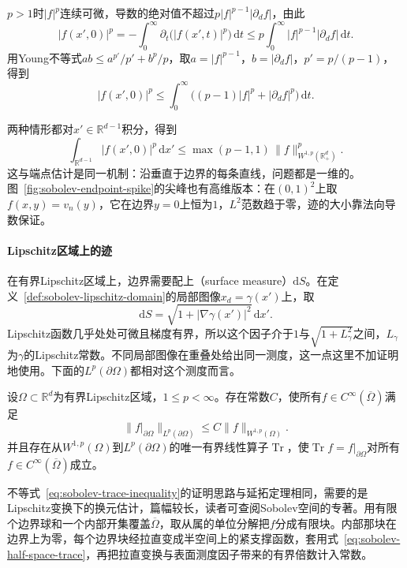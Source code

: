 $p>1$时$|f|^p$连续可微，导数的绝对值不超过$p|f|^{p-1}|\partial_df|$，由此
\[
|f(x',0)|^p=-\int_0^\infty\partial_t\bigl(|f(x',t)|^p\bigr)\,\mathrm dt
\leq p\int_0^\infty|f|^{p-1}|\partial_df|\,\mathrm dt .
\]
用Young不等式$ab\leq a^{p'}/p'+b^p/p$，取$a=|f|^{p-1}$，$b=|\partial_df|$，$p'=p/(p-1)$，得到
\[
|f(x',0)|^p\leq\int_0^\infty\bigl((p-1)|f|^p+|\partial_df|^p\bigr)\,\mathrm dt .
\]

两种情形都对$x'\in\mathbb R^{d-1}$积分，得到
\begin{equation}
\int_{\mathbb R^{d-1}}|f(x',0)|^p\,\mathrm dx'\leq\max(p-1,1)\,\lVert f\rVert_{W^{1,p}(\mathbb R^d_+)}^p .
\label{eq:sobolev-half-space-trace}
\end{equation}
这与端点估计是同一机制：沿垂直于边界的每条直线，问题都是一维的。图~\ref{fig:sobolev-endpoint-spike}的尖峰也有高维版本：在$(0,1)^2$上取$f(x,y)=v_n(y)$，它在边界$y=0$上恒为$1$，$L^2$范数趋于零，迹的大小靠法向导数保证。

\paragraph{Lipschitz区域上的迹}
在有界Lipschitz区域上，边界需要配上（surface measure）$\mathrm dS$。在定义~\ref{def:sobolev-lipschitz-domain}的局部图像$x_d=\gamma(x')$上，取
\[
\mathrm dS=\sqrt{1+|\nabla\gamma(x')|^2}\,\mathrm dx' .
\]
Lipschitz函数几乎处处可微且梯度有界，所以这个因子介于$1$与$\sqrt{1+L_\gamma^2}$之间，$L_\gamma$为$\gamma$的Lipschitz常数。不同局部图像在重叠处给出同一测度，这一点这里不加证明地使用。下面的$L^p(\partial\Omega)$都相对这个测度而言。

\begin{theorem}[迹定理]
\label{thm:sobolev-trace}
设$\Omega\subset\mathbb R^d$为有界Lipschitz区域，$1\leq p<\infty$。存在常数$C$，使所有$f\in C^\infty(\overline\Omega)$满足
\begin{equation}
\lVert f|_{\partial\Omega}\rVert_{L^p(\partial\Omega)}\leq C\lVert f\rVert_{W^{1,p}(\Omega)} .
\label{eq:sobolev-trace-inequality}
\end{equation}
并且存在从$W^{1,p}(\Omega)$到$L^p(\partial\Omega)$的唯一有界线性算子$\operatorname{Tr}$，使$\operatorname{Tr}f=f|_{\partial\Omega}$对所有$f\in C^\infty(\overline\Omega)$成立。
\end{theorem}

不等式~\eqref{eq:sobolev-trace-inequality}的证明思路与延拓定理相同，需要的是Lipschitz变换下的换元估计，篇幅较长，读者可查阅Sobolev空间的专著。用有限个边界球和一个内部开集覆盖$\overline\Omega$，取从属的单位分解把$f$分成有限块。内部那块在边界上为零，每个边界块经拉直变成半空间上的紧支撑函数，套用式~\eqref{eq:sobolev-half-space-trace}，再把拉直变换与表面测度因子带来的有界倍数计入常数。


